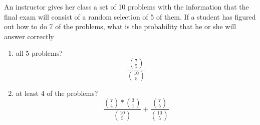 \item An instructor gives her class a set of 10 problems with the information that the final exam will consist of a random selection of 5 of them. If a student has figured out how to do 7 of the problems, what is the probability that he or she will answer correctly
\begin{enumerate}
    \item all 5 problems?
    \[ \frac{\binom{7}{5}}{\binom{10}{5}} \]
    \item at least 4 of the problems?
    \[ 
    \frac{\binom{7}{4}*\binom{3}{1}}{\binom{10}{5}} 
    + 
    \frac{\binom{7}{5}}{\binom{10}{5}} \]
\end{enumerate}
